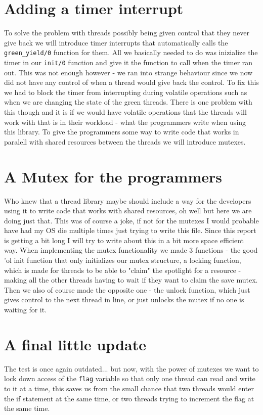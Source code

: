 \documentclass[a4paper, 12pt]{article}
\def\code#1{\texttt{#1}}
\begin{document}
\section{Adding a timer interrupt}
To solve the problem with threads possibly being given control that they never give back we will introduce timer interrupts that automatically calls the \code{green\_yield/0} function for them.
All we basically needed to do was inizialize the timer in our \code{init/0} function and give it the function to call when the timer ran out. This was not enough however - we ran into strange behaviour since we now did not have any control of when a thread would give back the control. To fix this we had to block the timer from interrupting during volatile operations such as when we are changing the state of the green threads. There is one problem with this though and it is if we would have volatile operations that the threads will work with that is in their workload - what the programmers write when using this library. To give the programmers some way to write code that works in paralell with shared resources between the threads we will introduce mutexes.

\section{A Mutex for the programmers}
Who knew that a thread library maybe should include a way for the developers using it to write code that works with shared resources, oh well but here we are doing just that. This was of course a joke, if not for the mutexes I would probable have had my OS die multiple times just trying to write this file. Since this report is getting a bit long I will try to write about this in a bit more space efficient way. When implementing the mutex functionality we made 3 functions - the good 'ol init function that only initializes our mutex structure, a locking function, which is made for threads to be able to "claim" the spotlight for a resource - making all the other threads having to wait if they want to claim the save mutex. Then we also of course made the opposite one - the unlock function, which just gives control to the next thread in line, or just unlocks the mutex if no one is waiting for it.

\section{A final little update}
The test is once again outdated... but now, with the power of mutexes we want to lock down access of the \code{flag} variable so that only one thread can read and write to it at a time, this saves us from the small chance that two threads would enter the if statement at the same time, or two threads trying to increment the flag at the same time.
\end{document}
